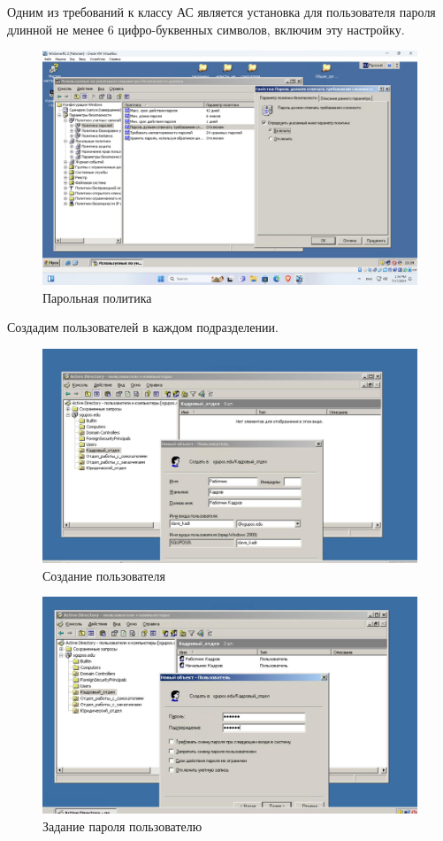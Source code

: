 Одним из требований к классу АС является установка для пользователя пароля длинной не менее 6 
цифро-буквенных символов, включим эту настройку.
\begin{figure}[H]
  \centering
  \includegraphics[width=1\textwidth]{pict/7}
  \caption{Парольная политика}
  \label{fig:19}
\end{figure}

Создадим пользователей в каждом подразделении.
\begin{figure}[H]
  \centering
  \includegraphics[width=1\textwidth]{pict/prac/1}
  \caption{Создание пользователя}
  \label{fig:12}
\end{figure}

\begin{figure}[H]
  \centering
  \includegraphics[width=1\textwidth]{pict/prac/2}
  \caption{Задание пароля пользователю}
  \label{fig:14}
\end{figure}

